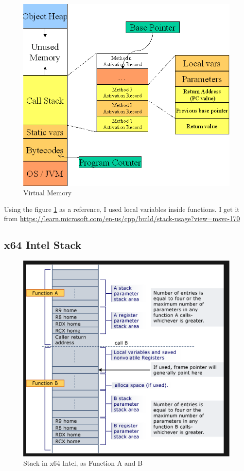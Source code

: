 \documentclass{article}
\begin{document}
\begin{figure}[H]
    \centering
    \includegraphics[width=\textwidth]{vm.png}
    \caption{Virtual Memory}
    \label{fig:vm}
\end{figure}

Using the figure \ref{fig:vm} as a reference, I used local variables inside functions. I get it from \url{https://learn.microsoft.com/en-us/cpp/build/stack-usage?view=msvc-170}

\subsection{x64 Intel Stack}

\begin{figure}[H]
    \centering
    \includegraphics[width=\textwidth]{x64_stack.png}
    \caption{Stack in x64 Intel, as Function A and B}
    \label{fig:x64_stack}
\end{figure}
\end{document}

